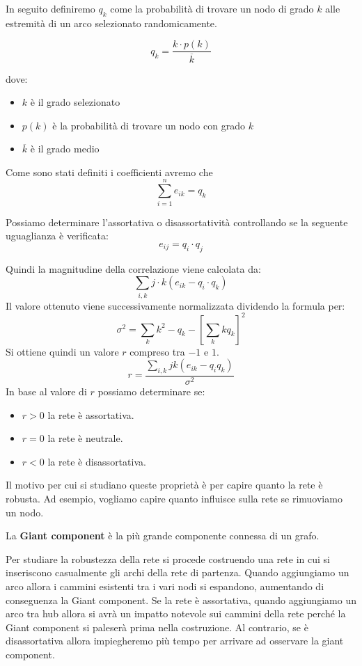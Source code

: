 In seguito definiremo $q_k$ come la probabilità di trovare un nodo di grado $k$ 
alle estremità di un arco selezionato randomicamente.

$$q_k = \frac{k\cdot p(k)}{\overline{k}}$$

dove:
\begin{itemize}
    \item $k$ è il grado selezionato
    \item $p(k)$ è la probabilità di trovare un nodo con grado $k$
    \item $\overline{k}$ è il grado medio
\end{itemize}

Come sono stati definiti i coefficienti avremo che 
$$\sum_{i=1}^{n}e_{ik} = q_k$$

Possiamo determinare l'assortativa o disassortatività controllando se la seguente
uguaglianza è verificata:
\begin{equation}
    e_{ij} = q_i \cdot q_j
\end{equation}

Quindi la magnitudine della correlazione viene calcolata da:
\begin{equation}
    \sum_{i, k}j\cdot k(e_{ik} - q_i\cdot q_k)
\end{equation}
Il valore ottenuto viene successivamente normalizzata dividendo la formula per:
\begin{equation}
    \sigma^2 = \sum_{k}k^2  - q_k - \left[\sum_{k}kq_k\right]^2
\end{equation}
Si ottiene quindi un valore $r$ compreso tra $-1$ e $1$.
\begin{equation}
    r = \frac{\sum_{i, k}jk(e_{ik} - q_iq_k)}{\sigma^2}
\end{equation}
In base al valore di $r$ possiamo determinare se:
\begin{itemize}
    \item $r > 0$ la rete è assortativa.
    \item $r = 0$ la rete è neutrale.
    \item $r < 0$ la rete è disassortativa.
\end{itemize}
Il motivo per cui si studiano queste proprietà è per capire quanto la rete è
robusta. Ad esempio, vogliamo capire quanto influisce sulla rete se rimuoviamo
un nodo.
\begin{definizione}
    La \textbf{Giant component} è la più grande componente connessa di un grafo.
\end{definizione}
Per studiare la robustezza della rete si procede costruendo una rete in cui si
inseriscono casualmente gli archi della rete di partenza. Quando aggiungiamo un
arco allora i cammini esistenti tra i vari nodi si espandono, aumentando di
conseguenza la Giant component. Se la rete è assortativa, quando aggiungiamo un
arco tra hub allora si avrà un impatto notevole sui cammini della rete perché la
Giant component si paleserà prima nella costruzione. Al contrario, se è
disassortativa allora impiegheremo più tempo per arrivare ad osservare la giant
component.

